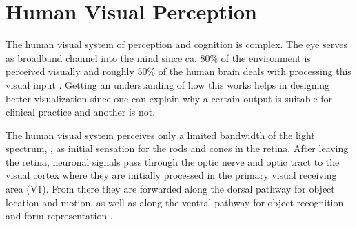 \section{Human Visual Perception}
\label{sec:background:perception}
The human visual system of perception and cognition is complex.
The eye serves as broadband channel into the mind since ca. 80\% of the environment is perceived visually \CN and roughly 50\% of the human brain deals with processing this visual input \CN.
Getting an understanding of how this works helps in designing better visualization since one can explain why a certain output is suitable for clinical practice and another is not.

The human visual system perceives only a limited bandwidth of the light spectrum, , as initial sensation for the rods and cones in the retina.
After leaving the retina, neuronal signals pass through the optic nerve and optic tract to the visual cortex where they are initially processed in the primary visual receiving area (V1). 
From there they are forwarded along the dorsal pathway for object location and motion, as well as along the ventral pathway for object recognition and form representation \cite{Goldstein:2013:Perception}.

